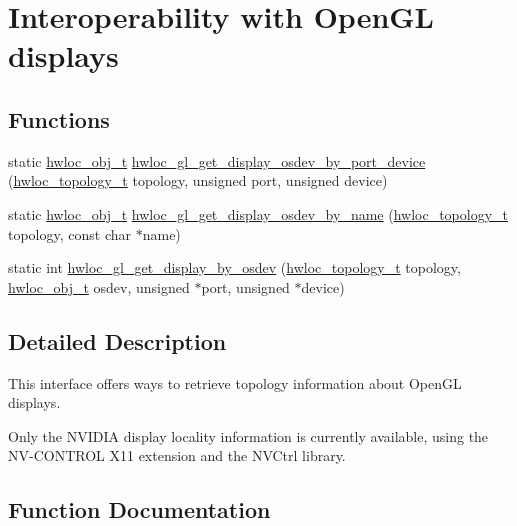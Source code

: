 \hypertarget{a00223}{}\section{Interoperability with Open\+GL displays}
\label{a00223}
\subsection*{Functions}
\begin{DoxyCompactItemize}
\item 
static \hyperlink{a00185_ga79b8ab56877ef99ac59b833203391c7d}{hwloc\+\_\+obj\+\_\+t} \hyperlink{a00223_ga4d66a77e4fe4051d6e5b772c1b8fcec5}{hwloc\+\_\+gl\+\_\+get\+\_\+display\+\_\+osdev\+\_\+by\+\_\+port\+\_\+device} (\hyperlink{a00186_ga9d1e76ee15a7dee158b786c30b6a6e38}{hwloc\+\_\+topology\+\_\+t} topology, unsigned port, unsigned device)
\item 
static \hyperlink{a00185_ga79b8ab56877ef99ac59b833203391c7d}{hwloc\+\_\+obj\+\_\+t} \hyperlink{a00223_ga2d36ef441d1dfddf49cfb5c01bd58d8e}{hwloc\+\_\+gl\+\_\+get\+\_\+display\+\_\+osdev\+\_\+by\+\_\+name} (\hyperlink{a00186_ga9d1e76ee15a7dee158b786c30b6a6e38}{hwloc\+\_\+topology\+\_\+t} topology, const char $\ast$name)
\item 
static int \hyperlink{a00223_ga936665ab5f0d29a081c4b78d11f4ad07}{hwloc\+\_\+gl\+\_\+get\+\_\+display\+\_\+by\+\_\+osdev} (\hyperlink{a00186_ga9d1e76ee15a7dee158b786c30b6a6e38}{hwloc\+\_\+topology\+\_\+t} topology, \hyperlink{a00185_ga79b8ab56877ef99ac59b833203391c7d}{hwloc\+\_\+obj\+\_\+t} osdev, unsigned $\ast$port, unsigned $\ast$device)
\end{DoxyCompactItemize}


\subsection{Detailed Description}
This interface offers ways to retrieve topology information about Open\+GL displays.

Only the N\+V\+I\+D\+IA display locality information is currently available, using the N\+V-\/\+C\+O\+N\+T\+R\+OL X11 extension and the N\+V\+Ctrl library. 

\subsection{Function Documentation}
\mbox{\label{a00223_ga936665ab5f0d29a081c4b78d11f4ad07}} 

